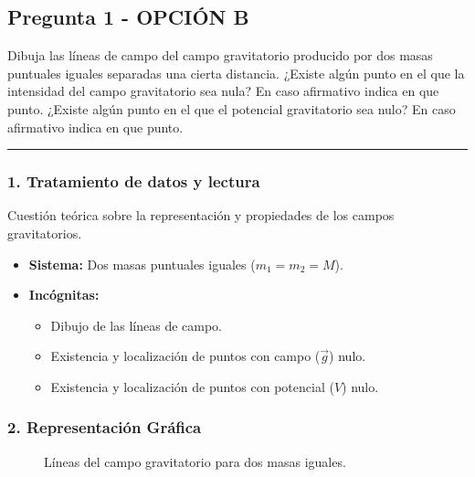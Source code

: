 \newpage

\subsection{Pregunta 1 - OPCIÓN B}
\label{subsec:1B_2003_sep_ext}

\begin{cajaenunciado}
Dibuja las líneas de campo del campo gravitatorio producido por dos masas puntuales iguales separadas una cierta distancia. ¿Existe algún punto en el que la intensidad del campo gravitatorio sea nula? En caso afirmativo indica en que punto. ¿Existe algún punto en el que el potencial gravitatorio sea nulo? En caso afirmativo indica en que punto.
\end{cajaenunciado}
\hrule

\subsubsection*{1. Tratamiento de datos y lectura}
Cuestión teórica sobre la representación y propiedades de los campos gravitatorios.
\begin{itemize}
    \item \textbf{Sistema:} Dos masas puntuales iguales ($m_1 = m_2 = M$).
    \item \textbf{Incógnitas:}
        \begin{itemize}
            \item Dibujo de las líneas de campo.
            \item Existencia y localización de puntos con campo ($\vec{g}$) nulo.
            \item Existencia y localización de puntos con potencial ($V$) nulo.
        \end{itemize}
\end{itemize}

\subsubsection*{2. Representación Gráfica}
\begin{figure}[H]
    \centering
    \caption{Líneas del campo gravitatorio para dos masas iguales.}
\end{figure}

